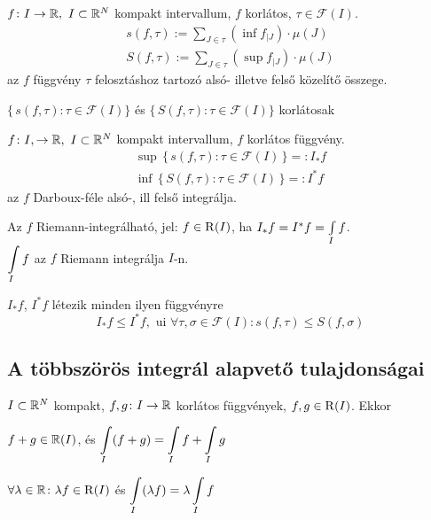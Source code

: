 \begin{de}
  $f\colon I\to\mathbb{R},\ I\subset \mathbb{R}^N$ kompakt intervallum, $f$ korlátos, $\tau\in\mathcal{F}(I)$.
  \begin{gather*}
    s(f,\tau):=\sum_{J\in\tau}(\inf f_{|J})\cdot \mu(J)\\
    S(f,\tau) :=\sum_{J\in\tau}(\sup f_{|J})\cdot \mu(J)
  \end{gather*}
  az $f$ függvény $\tau$ felosztáshoz tartozó alsó- illetve felső közelítő összege.
\end{de}
\begin{megj}
$\{\,s(f,\tau):\tau\in\mathcal{F}(I)\}$ és $\{\,S(f,\tau):\tau\in\mathcal{F}(I)\}$ korlátosak
\end{megj}
\begin{de}
  $f\colon I,\to \mathbb{R},\ I\subset \mathbb{R}^N$ kompakt intervallum, $f$ korlátos függvény.
  \begin{gather*}
    \sup\, \{\,s(f,\tau):\tau\in\mathcal{F}(I)\,\} =: I_*f\\
    \inf\, \{\,S(f,\tau):\tau\in\mathcal{F}(I)\,\} =: I^*f
  \end{gather*}
  az $f$ Darboux-féle alsó-, ill felső integrálja.
\end{de}

\begin{de}Az $f$ Riemann-integrálható, jel: $f\in\operatorname{R}(I)$, ha $I_*f=I^*f=\Int_If$.\\
  $\di\Int_If$ az $f$ Riemann integrálja $I$-n.
\end{de}

\begin{megj}$I_*f$, $I^*f$ létezik minden ilyen függvényre
\[I_*f\leq I^*f,\text{ ui }\forall\tau,\sigma\in\mathcal{F}(I)\colon s(f,\tau)\leq S(f,\sigma)\]
\end{megj}

\subsection{A többszörös integrál alapvető tulajdonságai}
\begin{te}
  $I\subset\mathbb{R}^N$ kompakt, $f,g\colon I\to\mathbb{R}$ korlátos függvények, $f,g\in\operatorname{R}(I)$. Ekkor
\begin{enumzjb}
  \item $f+g\in\mathbb{R}(I)$, és $\di\Int_I (f+g) = \Int_I f + \Int_I g$
  \item $\forall \lambda\in\mathbb{R}\colon \lambda f\in\operatorname{R}(I)$ és $\di\Int_I(\lambda f)=\lambda\Int_I f$
\end{enumzjb}
\end{te}

